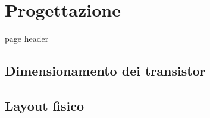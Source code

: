 
\chapter{Progettazione} %
\label{Chapter3} page header

\section{Dimensionamento dei transistor}
\label{sec:dimensionamento}

\section{Layout fisico}
\label{sec:layout}





